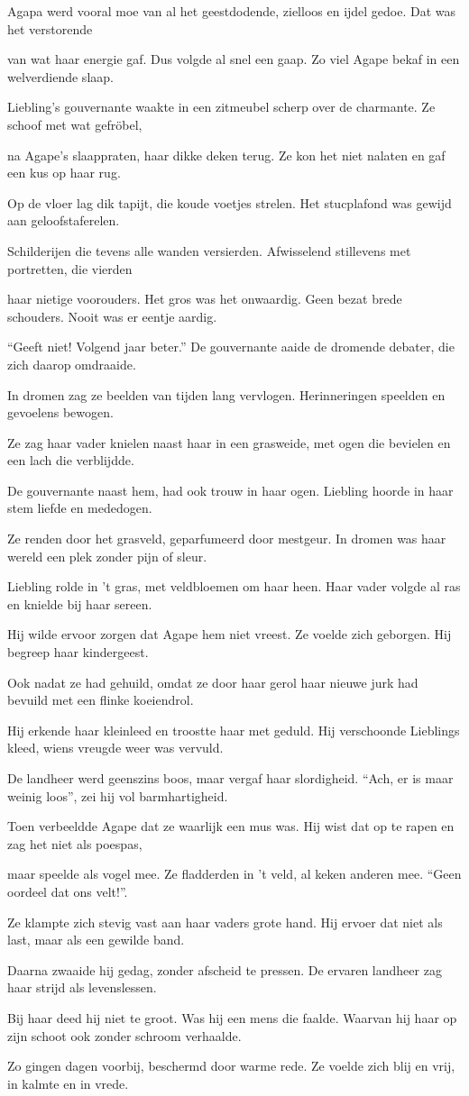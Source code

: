 Agapa werd vooral moe
van al het geestdodende,
zielloos en ijdel gedoe.
Dat was het verstorende

van wat haar energie gaf.
Dus volgde al snel een gaap.
Zo viel Agape bekaf
in een welverdiende slaap.

Liebling’s gouvernante
waakte in een zitmeubel
scherp over de charmante.
Ze schoof met wat gefröbel,

na Agape’s slaappraten,
haar dikke deken terug.
Ze kon het niet nalaten
en gaf een kus op haar rug.

Op de vloer lag dik tapijt,
die koude voetjes strelen.
Het stucplafond was gewijd
aan geloofstaferelen.

Schilderijen die tevens
alle wanden versierden.
Afwisselend stillevens
met portretten, die vierden

haar nietige voorouders.
Het gros was het onwaardig.
Geen bezat brede schouders.
Nooit was er eentje aardig.

“Geeft niet! Volgend jaar beter.”
De gouvernante aaide
de dromende debater,
die zich daarop omdraaide.

In dromen zag ze beelden
van tijden lang vervlogen.
Herinneringen speelden
en gevoelens bewogen.

Ze zag haar vader knielen
naast haar in een grasweide,
met ogen die bevielen
en een lach die verblijdde.

De gouvernante naast hem,
had ook trouw in haar ogen.
Liebling hoorde in haar stem
liefde en mededogen.

Ze renden door het grasveld,
geparfumeerd door mestgeur.
In dromen was haar wereld
een plek zonder pijn of sleur.

Liebling rolde in 't gras,
met veldbloemen om haar heen.
Haar vader volgde al ras
en knielde bij haar sereen.

Hij wilde ervoor zorgen
dat Agape hem niet vreest.
Ze voelde zich geborgen.
Hij begreep haar kindergeest.

Ook nadat ze had gehuild,
omdat ze door haar gerol
haar nieuwe jurk had bevuild
met een flinke koeiendrol.

Hij erkende haar kleinleed
en troostte haar met geduld.
Hij verschoonde Lieblings kleed,
wiens vreugde weer was vervuld.

De landheer werd geenszins boos,
maar vergaf haar slordigheid.
“Ach, er is maar weinig loos”,
zei hij vol barmhartigheid.

Toen verbeeldde Agape
dat ze waarlijk een mus was.
Hij wist dat op te rapen
en zag het niet als poespas,

maar speelde als vogel mee.
Ze fladderden in 't veld,
al keken anderen mee.
“Geen oordeel dat ons velt!”.

Ze klampte zich stevig vast
aan haar vaders grote hand.
Hij ervoer dat niet als last,
maar als een gewilde band.

Daarna zwaaide hij gedag,
zonder afscheid te pressen.
De ervaren landheer zag
haar strijd als levenslessen.

Bij haar deed hij niet te groot.
Was hij een mens die faalde.
Waarvan hij haar op zijn schoot
ook zonder schroom verhaalde.

Zo gingen dagen voorbij,
beschermd door warme rede.
Ze voelde zich blij en vrij,
in kalmte en in vrede.
